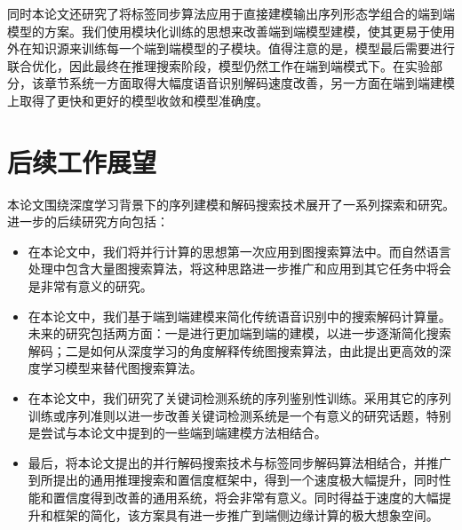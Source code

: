 同时本论文还研究了将标签同步算法应用于直接建模输出序列形态学组合的端到端模型的方案。我们使用模块化训练的思想来改善端到端模型建模，使其更易于使用外在知识源来训练每一个端到端模型的子模块。值得注意的是，模型最后需要进行联合优化，因此最终在推理搜索阶段，模型仍然工作在端到端模式下。在实验部分，该章节系统一方面取得大幅度语音识别解码速度改善，另一方面在端到端建模上取得了更快和更好的模型收敛和模型准确度。


\section{后续工作展望}
\label{chap:sum-future}

本论文围绕深度学习背景下的序列建模和解码搜索技术展开了一系列探索和研究。进一步的后续研究方向包括：
\begin{itemize}
	\item 在本论文中，我们将并行计算的思想第一次应用到图搜索算法中。而自然语言处理中包含大量图搜索算法，将这种思路进一步推广和应用到其它任务中将会是非常有意义的研究。
	\item 在本论文中，我们基于端到端建模来简化传统语音识别中的搜索解码计算量。未来的研究包括两方面：一是进行更加端到端的建模，以进一步逐渐简化搜索解码；二是如何从深度学习的角度解释传统图搜索算法，由此提出更高效的深度学习模型来替代图搜索算法。
	\item 在本论文中，我们研究了关键词检测系统的序列鉴别性训练。采用其它的序列训练或序列准则以进一步改善关键词检测系统是一个有意义的研究话题，特别是尝试与本论文中提到的一些端到端建模方法相结合。
	\item 最后，将本论文提出的并行解码搜索技术与标签同步解码算法相结合，并推广到所提出的通用推理搜索和置信度框架中，得到一个速度极大幅提升，同时性能和置信度得到改善的通用系统，将会非常有意义。同时得益于速度的大幅提升和框架的简化，该方案具有进一步推广到端侧边缘计算的极大想象空间。
\end{itemize}

